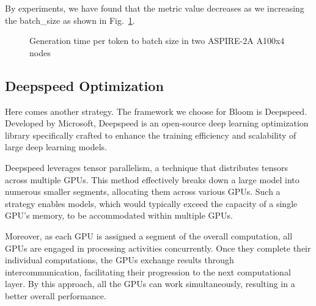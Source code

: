 By experiments, we have found that the metric value decreases as we increasing the batch\_size as shown in Fig.~\ref{fig:exp_bloom_batch}.

\begin{figure}
\centering
{}
\caption{Generation time per token to batch size in two ASPIRE-2A A100x4 nodes}
\label{fig:exp_bloom_batch}
\end{figure}


\subsection{Deepspeed Optimization}
Here comes another strategy. The framework we choose for Bloom is Deepspeed. Developed by Microsoft, Deepspeed is an open-source deep learning optimization library specifically crafted to enhance the training efficiency and scalability of large deep learning models.

Deepspeed leverages tensor parallelism, a technique that distributes tensors across multiple GPUs. This method effectively breaks down a large model into numerous smaller segments, allocating them across various GPUs. Such a strategy enables models, which would typically exceed the capacity of a single GPU's memory, to be accommodated within multiple GPUs.

Moreover, as each GPU is assigned a segment of the overall computation, all GPUs are engaged in processing activities concurrently. Once they complete their individual computations, the GPUs exchange results through intercommunication, facilitating their progression to the next computational layer. By this approach, all the GPUs can work simultaneously, resulting in a better overall performance.

